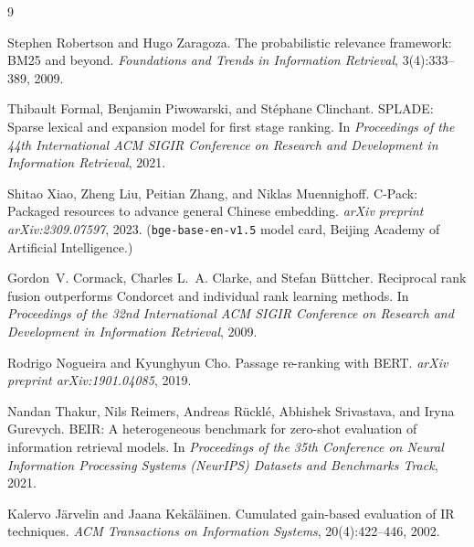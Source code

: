 \documentclass[11pt]{article}
\begin{document}

\begin{thebibliography}{9}

Stephen Robertson and Hugo Zaragoza.
\newblock The probabilistic relevance framework: BM25 and beyond.
\newblock \emph{Foundations and Trends in Information Retrieval}, 3(4):333--389, 2009.

Thibault Formal, Benjamin Piwowarski, and St{\'e}phane Clinchant.
\newblock SPLADE: Sparse lexical and expansion model for first stage ranking.
\newblock In \emph{Proceedings of the 44th International ACM SIGIR Conference on Research and Development in Information Retrieval}, 2021.

Shitao Xiao, Zheng Liu, Peitian Zhang, and Niklas Muennighoff.
\newblock C-Pack: Packaged resources to advance general Chinese embedding.
\newblock \emph{arXiv preprint arXiv:2309.07597}, 2023.
\newblock (\texttt{bge-base-en-v1.5} model card, Beijing Academy of Artificial Intelligence.)

Gordon~V. Cormack, Charles L.~A. Clarke, and Stefan B{\"u}ttcher.
\newblock Reciprocal rank fusion outperforms Condorcet and individual rank learning methods.
\newblock In \emph{Proceedings of the 32nd International ACM SIGIR Conference on Research and Development in Information Retrieval}, 2009.

Rodrigo Nogueira and Kyunghyun Cho.
\newblock Passage re-ranking with BERT.
\newblock \emph{arXiv preprint arXiv:1901.04085}, 2019.

Nandan Thakur, Nils Reimers, Andreas R{\"u}ckl{\'e}, Abhishek Srivastava, and Iryna Gurevych.
\newblock BEIR: A heterogeneous benchmark for zero-shot evaluation of information retrieval models.
\newblock In \emph{Proceedings of the 35th Conference on Neural Information Processing Systems (NeurIPS) Datasets and Benchmarks Track}, 2021.

Kalervo J{\"a}rvelin and Jaana Kek{\"a}l{\"a}inen.
\newblock Cumulated gain-based evaluation of IR techniques.
\newblock \emph{ACM Transactions on Information Systems}, 20(4):422--446, 2002.

\end{thebibliography}
\end{document}
